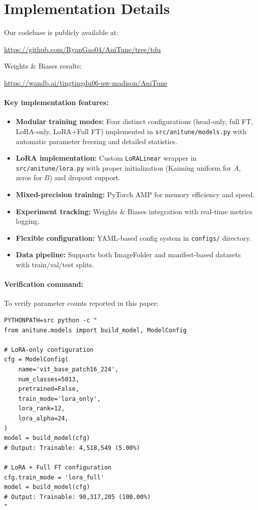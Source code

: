 \documentclass[11pt]{article}
\begin{document}
\section{Implementation Details}

Our codebase is publicly available at:
\begin{center}
\url{https://github.com/RyanGao04/AniTune/tree/tdu}
\end{center}
Weights \& Biases results:
\begin{center}
\url{https://wandb.ai/tingtingdu06-uw-madison/AniTune}
\end{center}

\paragraph{Key implementation features:}
\begin{itemize}
    \item \textbf{Modular training modes:} Four distinct configurations (head-only, full FT, LoRA-only, LoRA+Full FT) implemented in \texttt{src/anitune/models.py} with automatic parameter freezing and detailed statistics.

    \item \textbf{LoRA implementation:} Custom \texttt{LoRALinear} wrapper in \texttt{src/anitune/lora.py} with proper initialization (Kaiming uniform for $A$, zeros for $B$) and dropout support.

    \item \textbf{Mixed-precision training:} PyTorch AMP for memory efficiency and speed.

    \item \textbf{Experiment tracking:} Weights \& Biases integration with real-time metrics logging.

    \item \textbf{Flexible configuration:} YAML-based config system in \texttt{configs/} directory.

    \item \textbf{Data pipeline:} Supports both ImageFolder and manifest-based datasets with train/val/test splits.
\end{itemize}

\paragraph{Verification command:}
To verify parameter counts reported in this paper:
\begin{verbatim}
PYTHONPATH=src python -c "
from anitune.models import build_model, ModelConfig

# LoRA-only configuration
cfg = ModelConfig(
    name='vit_base_patch16_224',
    num_classes=5013,
    pretrained=False,
    train_mode='lora_only',
    lora_rank=12,
    lora_alpha=24,
)
model = build_model(cfg)
# Output: Trainable: 4,518,549 (5.00%)

# LoRA + Full FT configuration
cfg.train_mode = 'lora_full'
model = build_model(cfg)
# Output: Trainable: 90,317,205 (100.00%)
"
\end{verbatim}
\end{document}
